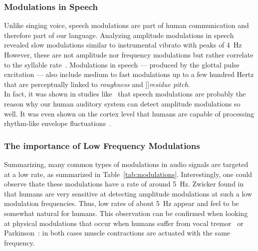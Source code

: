 \subsubsection*{Modulations in Speech}

Unlike singing voice, speech modulations are part of human communication and therefore part of our language.
Analyzing amplitude modulations in speech revealed slow modulations similar to instrumental vibrato with peaks of 4~\si{\hertz}~\cite{greenberg97, fuellgrabe09}
However, these are not amplitude nor frequency modulations but rather correlate to the syllable rate~\cite{plomp83, houtgast85}.
Modulations in speech --- produced by the glottal pulse excitation ---  also include medium to fast modulations up to a few hundred Hertz that are perceptually linked to \emph{roughness} and ]]\emph{residue pitch}.\\
In fact, it was shown in studies like~\cite{joris04} that speech modulations are probably the reason why our human auditory system can detect amplitude modulations so well.
It was even shown on the cortex level that humans are capable of processing rhythm-like envelope fluctuations~\cite{schreiner88, plomp83}.

\subsubsection*{The importance of Low Frequency Modulations}

Summarizing, many common types of modulations in audio signals are targeted at a low rate, as summarized in Table~\ref{tab:modulations}.
Interestingly, one could observe thate these modulations have a rate of around 5~\si{\hertz}. 
Zwicker found in~\cite{zwicker52} that humans are very sensitive at detecting amplitude modulations at such a low modulation frequencies.
Thus, low rates of about 5~\si{\hertz} appear and feel to be somewhat natural for humans.
This observation can be confirmed when looking at physical modulations that occur when humans suffer from vocal tremor~\cite{ramig87} or Parkinson~\cite{botzel14}: in both cases muscle contractions are actuated with the same frequency.

